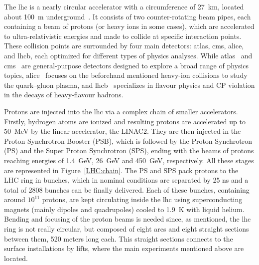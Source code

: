 The \acrshort{lhc} is a nearly circular accelerator with a circumference of 27~km, located about 100~m underground~\cite{Lyndon:Evans_2008}. It consists of two counter-rotating beam pipes, each containing a beam of protons (or heavy ions in some cases), which are accelerated to ultra-relativistic energies and made to collide at specific interaction points. These collision points are surrounded by four main detectors: \acrshort{atlas}, \acrshort{cms}, \acrshort{alice}, and \acrshort{lhcb}, each optimized for different types of physics analyses. While \acrshort{atlas}~\cite{ATLAS:exp} and \acrshort{cms}~\cite{CMS:exp} are general-purpose detectors designed to explore a broad range of physics topics, \acrshort{alice}~\cite{ALICE:exp} focuses on the beforehand mentioned heavy-ion collisions to study the quark–gluon plasma, and \acrshort{lhcb}~\cite{LHCb:exp} specializes in flavour physics and CP violation in the decays of heavy-flavour hadrons.

Protons are injected into the \acrshort{lhc} via a complex chain of smaller accelerators. Firstly, hydrogen atoms are ionized and resulting protons are accelerated up to 50~MeV by the linear accelerator, the LINAC2. They are then injected in the Proton Synchrotron Booster (PSB), which is followed by the Proton Synchrotron (PS) and the Super Proton Synchrotron (SPS), ending with the beams of protons reaching energies of 1.4~GeV, 26~GeV and 450~GeV, respectively. All these stages are represented in Figure~\ref{LHC:chain}. The PS and SPS pack protons to the LHC ring in bunches, which in nominal conditions are separated by 25 ns and a total of 2808 bunches can be finally delivered. Each of these bunches, containing around $10^{11}$ protons, are kept circulating inside the \acrshort{lhc} using superconducting magnets (mainly dipoles and quadrupoles) cooled to 1.9~K with liquid helium. Bending and focusing of the proton beams is needed since, as mentioned, the \acrshort{lhc} ring is not really circular, 
but composed of eight arcs and eight straight sections between them, 520 meters long each. This straight sections connects to the surface installations by lifts, where the main experiments mentioned above are located.

